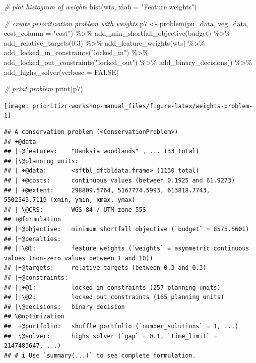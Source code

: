 \documentclass[
  12pt,
]{book}
\newenvironment{Shaded}{\begin{snugshade}}{\end{snugshade}}
\newcommand{\AttributeTok}[1]{\textcolor[rgb]{0.77,0.63,0.00}{#1}}
\newcommand{\CommentTok}[1]{\textcolor[rgb]{0.56,0.35,0.01}{\textit{#1}}}
\newcommand{\ConstantTok}[1]{\textcolor[rgb]{0.00,0.00,0.00}{#1}}
\newcommand{\FloatTok}[1]{\textcolor[rgb]{0.00,0.00,0.81}{#1}}
\newcommand{\FunctionTok}[1]{\textcolor[rgb]{0.00,0.00,0.00}{#1}}
\newcommand{\NormalTok}[1]{#1}
\newcommand{\OtherTok}[1]{\textcolor[rgb]{0.56,0.35,0.01}{#1}}
\newcommand{\SpecialCharTok}[1]{\textcolor[rgb]{0.00,0.00,0.00}{#1}}
\newcommand{\StringTok}[1]{\textcolor[rgb]{0.31,0.60,0.02}{#1}}
\begin{document}
\begin{Shaded}
\begin{Highlighting}[]
\CommentTok{\# plot histogram of weights}
\FunctionTok{hist}\NormalTok{(wts, }\AttributeTok{xlab =} \StringTok{"Feature weights"}\NormalTok{)}

\CommentTok{\# create prioritization problem with weights}
\NormalTok{p7 }\OtherTok{\textless{}{-}}
  \FunctionTok{problem}\NormalTok{(pu\_data, veg\_data, }\AttributeTok{cost\_column =} \StringTok{"cost"}\NormalTok{) }\SpecialCharTok{\%\textgreater{}\%}
  \FunctionTok{add\_min\_shortfall\_objective}\NormalTok{(budget) }\SpecialCharTok{\%\textgreater{}\%}
  \FunctionTok{add\_relative\_targets}\NormalTok{(}\FloatTok{0.3}\NormalTok{) }\SpecialCharTok{\%\textgreater{}\%}
  \FunctionTok{add\_feature\_weights}\NormalTok{(wts) }\SpecialCharTok{\%\textgreater{}\%}
  \FunctionTok{add\_locked\_in\_constraints}\NormalTok{(}\StringTok{"locked\_in"}\NormalTok{) }\SpecialCharTok{\%\textgreater{}\%}
  \FunctionTok{add\_locked\_out\_constraints}\NormalTok{(}\StringTok{"locked\_out"}\NormalTok{) }\SpecialCharTok{\%\textgreater{}\%}
  \FunctionTok{add\_binary\_decisions}\NormalTok{() }\SpecialCharTok{\%\textgreater{}\%}
  \FunctionTok{add\_highs\_solver}\NormalTok{(}\AttributeTok{verbose =} \ConstantTok{FALSE}\NormalTok{)}

\CommentTok{\# print problem}
\FunctionTok{print}\NormalTok{(p7)}
\end{Highlighting}
\end{Shaded}

\begin{center}\texttt{[image: prioritizr-workshop-manual\_files/figure-latex/weights-problem-1]} \end{center}

\begin{verbatim}
## A conservation problem (<ConservationProblem>)
## +@data
## |+@features:    "Banksia woodlands" , ... (33 total)
## |\@planning units:
## | +@data:       <sftbl_dftbldata.frame> (1130 total)
## | +@costs:      continuous values (between 0.1925 and 61.9273)
## | +@extent:     298809.5764, 5167774.5993, 613818.7743, 5502543.7119 (xmin, ymin, xmax, ymax)
## | \@CRS:        WGS 84 / UTM zone 55S
## +@formulation
## |+@objective:   minimum shortfall objective (`budget` = 8575.5601)
## |+@penalties:
## ||\@1:          feature weights (`weights` = asymmetric continuous values (non-zero values between 1 and 10))
## |+@targets:     relative targets (between 0.3 and 0.3)
## |+@constraints:
## ||+@1:          locked in constraints (257 planning units)
## ||\@2:          locked out constraints (165 planning units)
## |\@decisions:   binary decision
## \@optimization
##  +@portfolio:   shuffle portfolio (`number_solutions` = 1, ...)
##  \@solver:      highs solver (`gap` = 0.1, `time_limit` = 2147483647, ...)
## # i Use `summary(...)` to see complete formulation.
\end{verbatim}
\end{document}
